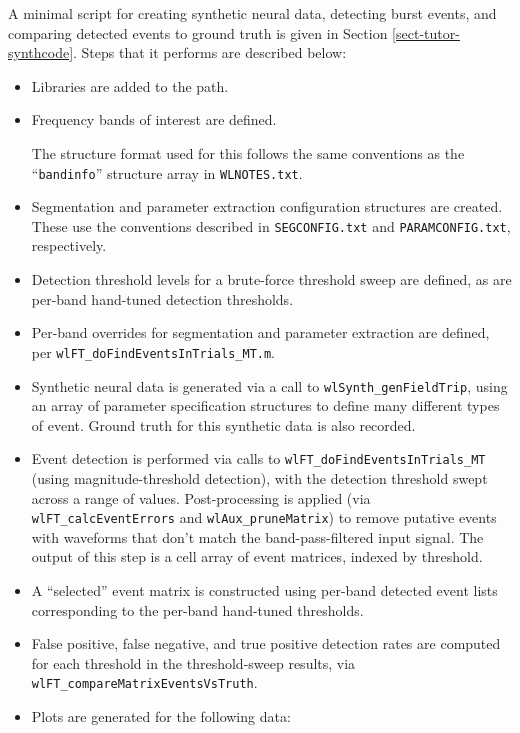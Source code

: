 A minimal script for creating synthetic neural data, detecting burst events,
and comparing detected events to ground truth is given in Section
\ref{sect-tutor-synthcode}. Steps that it performs are described below:

\begin{itemize}
%
\item Libraries are added to the path.
%
\item Frequency bands of interest are defined.

The structure format used for this follows the same conventions as the
``\texttt{bandinfo}'' structure array in \texttt{WLNOTES.txt}.
%
\item Segmentation and parameter extraction configuration structures are
created. These use the conventions described in \texttt{SEGCONFIG.txt}
and \texttt{PARAMCONFIG.txt}, respectively.
%
\item Detection threshold levels for a brute-force threshold sweep are
defined, as are per-band hand-tuned detection thresholds.
%
\item Per-band overrides for segmentation and parameter extraction are
defined, per \linebreak \texttt{wlFT\_doFindEventsInTrials\_MT.m}.
%
\item Synthetic neural data is generated via a call to
\texttt{wlSynth\_genFieldTrip}, using an array of parameter
specification structures to define many different types of event. Ground
truth for this synthetic data is also recorded.
%
\item Event detection is performed via calls to
\texttt{wlFT\_doFindEventsInTrials\_MT} (using magnitude-threshold detection),
with the detection threshold swept across a range of values. Post-processing
is applied (via \texttt{wlFT\_calcEventErrors} and
\texttt{wlAux\_pruneMatrix}) to remove putative events with waveforms that
don't match the band-pass-filtered input signal.
%
The output of this step is a cell array of event matrices, indexed by
threshold.
%
\item A ``selected'' event matrix is constructed using per-band detected
event lists corresponding to the per-band hand-tuned thresholds.
%
\item False positive, false negative, and true positive detection rates are
computed for each threshold in the threshold-sweep results, via
\texttt{wlFT\_compareMatrixEventsVsTruth}.
%
\item Plots are generated for the following data:
%
\begin{itemize}

\end{itemize}
\end{itemize}
